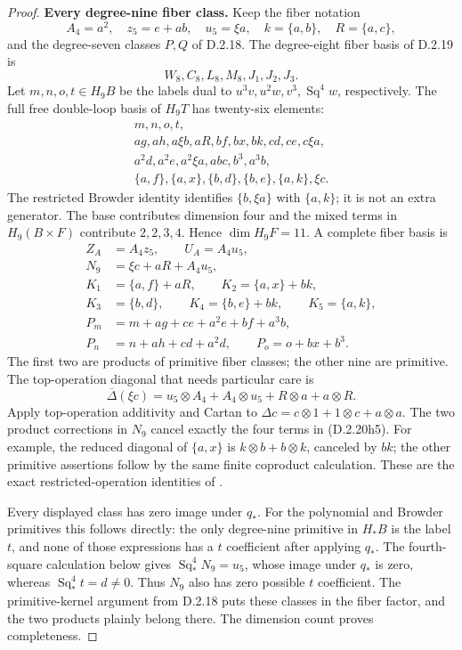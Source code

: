 \begin{proof}
\textbf{Every degree-nine fiber class.}
Keep the fiber notation
\[
 A_4=a^2,\quad z_5=e+ab,\quad u_5=\xi a,
 \quad k=\{a,b\},\quad R=\{a,c\},
\]
and the degree-seven classes $P,Q$ of D.2.18.
The degree-eight fiber basis of D.2.19 is
\[
 W_8,C_8,L_8,M_8,J_1,J_2,J_3.
\]
Let $m,n,o,t\in H_9B$ be the labels dual to
$u^3v,u^2w,v^3,\operatorname{Sq}^4w$, respectively.
The full free double-loop basis of $H_9T$ has twenty-six
elements:
\[
\begin{gathered}
 m,n,o,t,\\
 ag,ah,a\xi b,aR,bf,bx,bk,cd,ce,c\xi a,\\
 a^2d,a^2e,a^2\xi a,abc,b^3,a^3b,\\
 \{a,f\},\{a,x\},\{b,d\},\{b,e\},\{a,k\},\xi c.
\end{gathered}
 \tag{D.2.20h3}
\]
The restricted Browder identity identifies
$\{b,\xi a\}$ with $\{a,k\}$; it is not an extra
generator. The base contributes dimension four and
the mixed terms in $H_9(B\times F)$ contribute
$2,2,3,4$. Hence $\dim H_9F=11$.
A complete fiber basis is
\[
\begin{split}
 Z_A&=A_4z_5,\qquad U_A=A_4u_5,\\
 N_9&=\xi c+aR+A_4u_5,\\
 K_1&=\{a,f\}+aR,\qquad
 K_2=\{a,x\}+bk,\\
 K_3&=\{b,d\},\qquad
 K_4=\{b,e\}+bk,\qquad K_5=\{a,k\},\\
 P_m&=m+ag+ce+a^2e+bf+a^3b,\\
 P_n&=n+ah+cd+a^2d,\qquad
 P_o=o+bx+b^3.
\end{split}
 \tag{D.2.20h4}
\]
The first two are products of primitive fiber classes;
the other nine are primitive. The top-operation diagonal
that needs particular care is
\[
 \overline\Delta(\xi c)
 =u_5\otimes A_4+A_4\otimes u_5
       +R\otimes a+a\otimes R.
 \tag{D.2.20h5}
\]
Apply top-operation additivity and Cartan to
$\Delta c=c\otimes1+1\otimes c+a\otimes a$.
The two product corrections in $N_9$ cancel exactly
the four terms in \textup{(D.2.20h5)}.
For example, the reduced diagonal of $\{a,x\}$ is
$k\otimes b+b\otimes k$, canceled by $bk$;
the other primitive assertions follow by the same
finite coproduct calculation. These are the exact
restricted-operation identities of
\cite[Chapter~III, Theorem~1.3(2)--(5), pp.~217--218]
{I_CohenLadaMay1976}.

Every displayed class has zero image under $q_*$.
For the polynomial and Browder primitives this follows
directly: the only degree-nine primitive in $H_*B$
is the label $t$, and none of those expressions has
a $t$ coefficient after applying $q_*$. The fourth-square
calculation below gives
$\operatorname{Sq}_*^4N_9=u_5$, whose image under $q_*$
is zero, whereas $\operatorname{Sq}_*^4t=d\ne0$.
Thus $N_9$ also has zero possible $t$ coefficient.
The primitive-kernel argument from D.2.18 puts these
classes in the fiber factor, and the two products
plainly belong there. The dimension count proves
completeness.


\end{proof}
